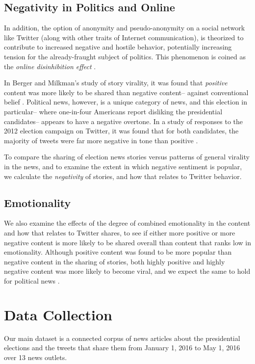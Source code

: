 \documentclass[letterpaper]{article}
\begin{document}
\subsection{Negativity in Politics and Online}
In addition, the option of anonymity and pseudo-anonymity on a social network like Twitter (along with other traits of Internet communication), is theorized to contribute to increased negative and hostile behavior, potentially increasing tension for the already-fraught subject of politics. This phenomenon is coined as the \emph{online disinhibition effect} \cite{suler2004online}. 

In Berger and Milkman’s study of story virality, it was found that \emph{positive} content was more likely to be shared than negative content-- against conventional belief \cite{berger2012makes}. Political news, however, is a unique category of news, and this election in particular-- where one-in-four Americans report disliking the presidential candidates-- appears to have a negative overtone. In a study of responses to the 2012 election campaign on Twitter, it was found that for both candidates, the majority of tweets were far more negative in tone than positive \cite{mitchell2013twitter}.

To compare the sharing of election news stories versus patterns of general virality in the news, and to examine the extent in which negative sentiment is popular, we calculate the \emph{negativity} of stories, and how that relates to Twitter behavior.


\subsection{Emotionality}
We also examine the effects of the degree of combined emotionality in the content and how that relates to Twitter shares, to see if either more positive or more negative content is more likely to be shared overall than content that ranks low in emotionality. Although positive content was found to be more popular than negative content in the sharing of stories, both highly positive and highly negative content was more likely to become viral, and we expect the same to hold for political news \cite{berger2012makes}. 
 
\section{Data Collection}
 Our main dataset is a connected corpus of news articles about the presidential elections and the tweets that share them from January 1, 2016 to May 1, 2016 over 13 news outlets.  
\end{document}
